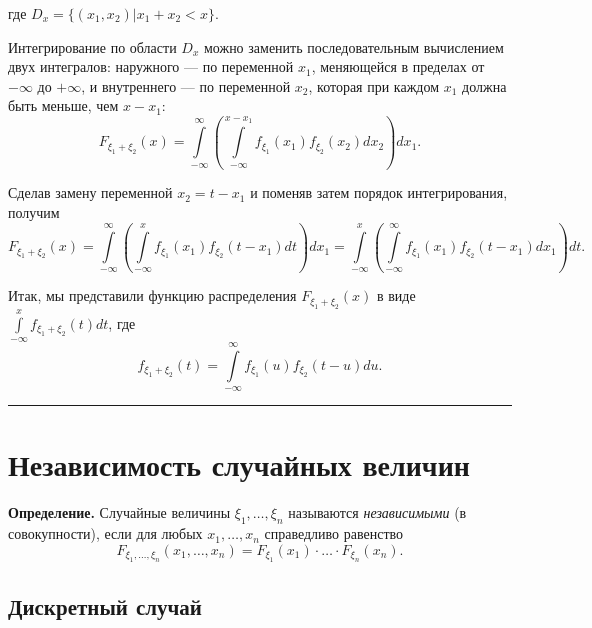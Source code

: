 \documentclass[11pt,a4paper]{article}
\begin{document}
где \(D_x = \{(x_1,x_2) | x_1+x_2<x\}\).

Интегрирование по области \(D_x\) можно заменить последовательным
вычислением двух интегралов: наружного --- по переменной \(x_1\),
меняющейся в пределах от \(-\infty\) до \(+\infty\), и внутреннего ---
по переменной \(x_2\), которая при каждом \(x_1\) должна быть меньше,
чем \(x - x_1\): \[
  F_{\xi_1 +\xi_2}(x) = \int\limits_{-\infty}^{\infty} \left( \int\limits_{-\infty}^{x-x_1} f_{\xi_1}(x_1) f_{\xi_2}(x_2) dx_2 \right) dx_1.
\]

Сделав замену переменной \(x_2 = t - x_1\) и поменяв затем порядок
интегрирования, получим \[
  F_{\xi_1 +\xi_2}(x) = \int\limits_{-\infty}^{\infty} \left( \int\limits_{-\infty}^{x} f_{\xi_1}(x_1) f_{\xi_2}(t-x_1) dt \right) dx_1
  = \int\limits_{-\infty}^{x} \left( \int\limits_{-\infty}^{\infty} f_{\xi_1}(x_1) f_{\xi_2}(t-x_1) dx_1 \right) dt.
\]

Итак, мы представили функцию распределения \(F_{\xi_1 +\xi_2}(x)\) в
виде \(\int\limits_{-\infty}^{x} f_{\xi_1+\xi_2}(t)dt\), где \[
  f_{\xi_1+\xi_2}(t) = \int\limits_{-\infty}^{\infty} f_{\xi_1}(u) f_{\xi_2}(t-u) du.
\]

    \begin{center}\rule{0.5\linewidth}{0.5pt}\end{center}

    \hypertarget{ux43dux435ux437ux430ux432ux438ux441ux438ux43cux43eux441ux442ux44c-ux441ux43bux443ux447ux430ux439ux43dux44bux445-ux432ux435ux43bux438ux447ux438ux43d}{%
\section{Независимость случайных
величин}\label{ux43dux435ux437ux430ux432ux438ux441ux438ux43cux43eux441ux442ux44c-ux441ux43bux443ux447ux430ux439ux43dux44bux445-ux432ux435ux43bux438ux447ux438ux43d}}

\textbf{Определение.} Случайные величины \(\xi_1, \dots, \xi_n\)
называются \emph{независимыми} (в совокупности), если для любых
\(x_1, \dots, x_n\) справедливо равенство
\[ F_{\xi_1, \dots, \xi_n}(x_1, \dots, x_n) = F_{\xi_1}(x_1) \cdot \ldots \cdot F_{\xi_n}(x_n).\]

    \hypertarget{ux434ux438ux441ux43aux440ux435ux442ux43dux44bux439-ux441ux43bux443ux447ux430ux439}{%
\subsection{Дискретный
случай}\label{ux434ux438ux441ux43aux440ux435ux442ux43dux44bux439-ux441ux43bux443ux447ux430ux439}}
\end{document}

